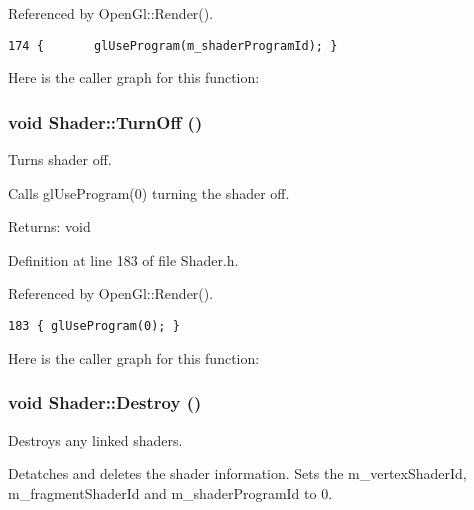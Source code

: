 Referenced by OpenGl::Render().

\begin{Code}\begin{verbatim}174 {       glUseProgram(m_shaderProgramId); }
\end{verbatim}
\end{Code}




Here is the caller graph for this function:\hypertarget{class_shader_d94b005141a4ed31a3f4f801455e5590}{
\subsubsection[TurnOff]{\setlength{\rightskip}{0pt plus 5cm}void Shader::TurnOff ()}}
\label{class_shader_d94b005141a4ed31a3f4f801455e5590}


Turns shader off. 

Calls glUseProgram(0) turning the shader off.

\begin{Desc}
\item[Returns:]void \end{Desc}


Definition at line 183 of file Shader.h.

Referenced by OpenGl::Render().

\begin{Code}\begin{verbatim}183 { glUseProgram(0); }
\end{verbatim}
\end{Code}




Here is the caller graph for this function:\hypertarget{class_shader_b6fc1a824cb122fcb0c902397e20f72f}{
\subsubsection[Destroy]{\setlength{\rightskip}{0pt plus 5cm}void Shader::Destroy ()}}
\label{class_shader_b6fc1a824cb122fcb0c902397e20f72f}


Destroys any linked shaders. 

Detatches and deletes the shader information. Sets the m\_\-vertexShaderId, m\_\-fragmentShaderId and m\_\-shaderProgramId to 0.

